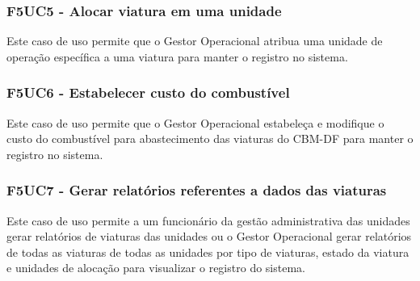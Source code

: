   \subsubsection{F5UC5 - Alocar viatura em uma unidade}
Este caso de uso permite que o Gestor Operacional atribua uma unidade de operação específica a uma viatura para manter o 
registro no sistema.

  \subsubsection{F5UC6 - Estabelecer custo do combustível}
Este caso de uso permite que o Gestor Operacional estabeleça e modifique o custo do combustível para abastecimento
das viaturas do CBM-DF para manter o registro no sistema.

  \subsubsection{F5UC7 - Gerar relatórios referentes a dados das viaturas}
Este caso de uso permite a um funcionário da gestão administrativa das unidades gerar relatórios de viaturas das
unidades ou o Gestor Operacional gerar relatórios de todas as viaturas de todas as unidades por tipo de viaturas,
estado da viatura e unidades de alocação para visualizar o registro do sistema.

